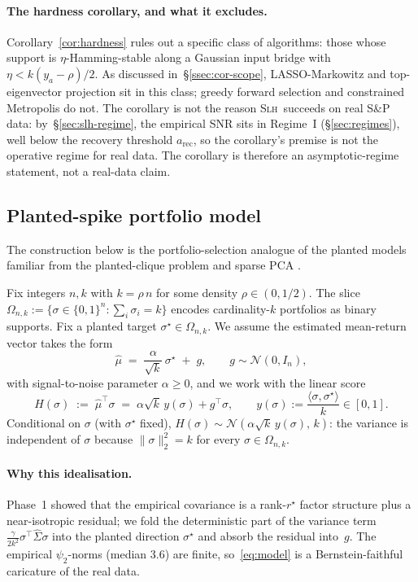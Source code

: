 \paragraph{The hardness corollary, and what it excludes.}
Corollary~\ref{cor:hardness} rules out a specific class of algorithms: those whose
support is $\eta$-Hamming-stable along a Gaussian input bridge with
$\eta < k(y_a - \rho)/2$. As discussed in~\S\ref{ssec:cor-scope}, LASSO-Markowitz and
top-eigenvector projection sit in this class; greedy forward selection and constrained
Metropolis do not. The corollary is not the reason \textsc{Slh}\ succeeds on real S\&P
data: by~\S\ref{sec:slh-regime}, the empirical SNR sits in Regime~I
(\S\ref{sec:regimes}), well below the recovery threshold $a_{\mathrm{rec}}$, so the
corollary's premise is not the operative regime for real data. The corollary is
therefore an asymptotic-regime statement, not a real-data claim.

\subsection{Planted-spike portfolio model}

The construction below is the portfolio-selection analogue of the planted models familiar from
the planted-clique problem and sparse PCA \cite{ben-arous-wein}.

Fix integers $n,k$ with $k = \rho\, n$ for some density $\rho\in(0,1/2)$. The slice
$\Omega_{n,k} := \{\sigma\in\{0,1\}^n : \sum_{i}\sigma_i = k\}$ encodes cardinality-$k$
portfolios as binary supports. Fix a planted target $\sigma^\star\in\Omega_{n,k}$. We
assume the estimated mean-return vector takes the form
\begin{equation}
\hat\mu \;=\; \frac{\alpha}{\sqrt{k}}\,\sigma^\star \;+\; g, \qquad g\sim\mathcal N(0, I_n),
\label{eq:model}
\end{equation}
with signal-to-noise parameter $\alpha\geq 0$, and we work with the linear
score
\begin{equation}
H(\sigma) \;:=\; \hat\mu^\top\sigma \;=\; \alpha\sqrt{k}\,y(\sigma) + g^\top\sigma,
\qquad y(\sigma) := \frac{\langle\sigma,\sigma^\star\rangle}{k}\in[0,1].
\label{eq:H}
\end{equation}
Conditional on $\sigma$ (with $\sigma^\star$ fixed), $H(\sigma)\sim\mathcal N(\alpha\sqrt
k\,y(\sigma),\, k)$: the variance is independent of $\sigma$ because $\|\sigma\|_2^2=k$
for every $\sigma\in\Omega_{n,k}$.

\paragraph{Why this idealisation.} Phase~1 showed that the empirical covariance is a
rank-$r^\star$ factor structure plus a near-isotropic residual; we fold the
deterministic part of the variance term $\frac{\gamma}{2k^2}\sigma^\top\hat\Sigma\sigma$
into the planted direction $\sigma^\star$ and absorb the residual into~$g$. The
empirical $\psi_2$-norms (median 3.6) are finite, so~\eqref{eq:model} is a
Bernstein-faithful caricature of the real data.

